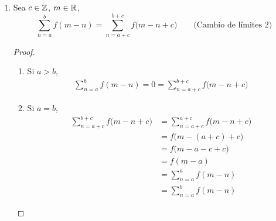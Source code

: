 \begin{enumerate}[label=\alph*)]
\begin{enumerate}[label=\Roman*)]
\begin{enumerate}[label=\roman*)]
      \item Notemos que
      \begin{align*}
        \sum_{n=a}^{a+k+1} f(\ell+n) &= f\Bigl(\ell+ (a+k+1)\Bigr) + \sum_{n=a}^{a} f(\ell+ n)\\
        &= f(\ell+a+k+1) + f(\ell+a)\\
        &= f(\ell+a+k+1) + f(\ell +(a+c)-c)\\
        &= f\bigl(\ell+(a+k+1+c)-c\bigr) + \sum_{n=a+c}^{a+c} f(\ell+ n-c)\\
        &= \sum_{n=a+c}^{(a+k+1)+c} f(\ell+n-c)
      \end{align*}
    \end{enumerate}


    Por lo que en general, planteamos la proposición como sigue:

    Si $c\in \Z$, $\ell \in \R$, entonces \[\sum_{n=a}^b f(\ell+n) = \sum_{n=a+c}^{b+c} f(\ell+n-c) \qquad \text{(Cambio de límites 1)}\]
    
  \end{enumerate}

  \item Sea $c\in \Z$, $m\in \mathbb{R}$, \[\sum_{n=a}^b f(m-n) = \sum_{n=a+c}^{b+c} f\bigl(m-n+c\bigr) \qquad \text{(Cambio de límites 2)}\]
  \begin{proof}\leavevmode
    \begin{enumerate}[label=\roman*)]
    \item Si $a>b$,
    \begin{align*}
      \sum_{n=a}^b f(m-n) = 0 = \sum_{n=a+c}^{b+c} f\bigl(m-n+c\bigr)
    \end{align*}

    \item Si $a=b$,
    \begin{align*}
      \sum_{n=a+c}^{b+c} f\bigl(m-n+c\bigr) &= \sum_{n=a+c}^{a+c} f\bigl(m-n+c\bigr)\\
      &= f\bigl(m-(a+c)+c\bigr)\\
      &= f\bigl(m-a-c+c\bigr)\\
      &= f(m-a)\\
      &= \sum_{n=a}^a f(m-n)\\
      &= \sum_{n=a}^b f(m-n)
    \end{align*}


\end{enumerate}
\end{proof}
\end{enumerate}
